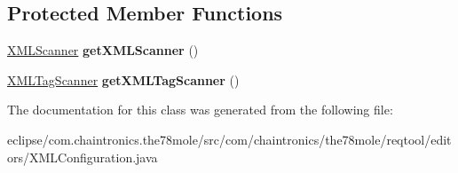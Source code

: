 \subsection*{Protected Member Functions}
\begin{DoxyCompactItemize}
\item 
\hyperlink{classcom_1_1chaintronics_1_1the78mole_1_1reqtool_1_1editors_1_1XMLScanner}{X\+M\+L\+Scanner} {\bfseries get\+X\+M\+L\+Scanner} ()\hypertarget{classcom_1_1chaintronics_1_1the78mole_1_1reqtool_1_1editors_1_1XMLConfiguration_a800ad014c1970bcb3909223a1bb40722}{}\label{classcom_1_1chaintronics_1_1the78mole_1_1reqtool_1_1editors_1_1XMLConfiguration_a800ad014c1970bcb3909223a1bb40722}

\item 
\hyperlink{classcom_1_1chaintronics_1_1the78mole_1_1reqtool_1_1editors_1_1XMLTagScanner}{X\+M\+L\+Tag\+Scanner} {\bfseries get\+X\+M\+L\+Tag\+Scanner} ()\hypertarget{classcom_1_1chaintronics_1_1the78mole_1_1reqtool_1_1editors_1_1XMLConfiguration_aa67eae3ac47d202431882ea8885463ac}{}\label{classcom_1_1chaintronics_1_1the78mole_1_1reqtool_1_1editors_1_1XMLConfiguration_aa67eae3ac47d202431882ea8885463ac}

\end{DoxyCompactItemize}


The documentation for this class was generated from the following file\+:\begin{DoxyCompactItemize}
\item 
eclipse/com.\+chaintronics.\+the78mole/src/com/chaintronics/the78mole/reqtool/editors/X\+M\+L\+Configuration.\+java\end{DoxyCompactItemize}
